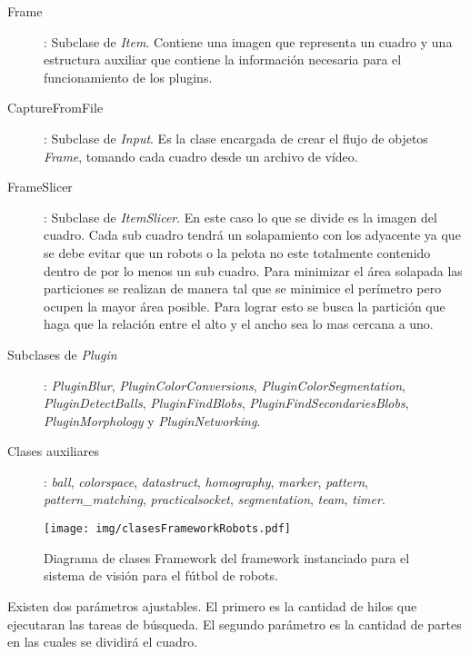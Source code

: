 \begin{description}

\item[Frame]: Subclase de \emph{Item}. Contiene una imagen que representa un
	cuadro y una estructura auxiliar que contiene la información necesaria
	para el funcionamiento de los plugins.

\item[CaptureFromFile]: Subclase de \emph{Input}. Es la clase encargada de crear
	el flujo de objetos \emph{Frame}, tomando cada cuadro desde un archivo
	de vídeo.

\item[FrameSlicer]: Subclase de \emph{ItemSlicer}. En este caso lo que se divide
	es la imagen del cuadro. Cada sub cuadro tendrá un solapamiento con los
	adyacente ya que se debe evitar que un robots o la pelota no este
	totalmente contenido dentro de por lo menos un sub cuadro. Para
	minimizar el área solapada las particiones se realizan de manera tal que
	se minimice el perímetro pero ocupen la mayor área posible. Para lograr
	esto se busca la partición que haga que la relación entre el alto y el
	ancho sea lo mas cercana a uno.

\item[Subclases de \emph{Plugin}]: \emph{PluginBlur},
	\emph{PluginColorConversions}, \emph{PluginColorSegmentation},
	\emph{PluginDetectBalls}, \emph{PluginFindBlobs},
	\emph{PluginFindSecondariesBlobs}, \emph{PluginMorphology} y
	\emph{PluginNetworking}.

\item[Clases auxiliares]: \emph{ball}, \emph{colorspace}, \emph{datastruct},
	\emph{homography}, \emph{marker}, \emph{pattern},
	\emph{pattern\_matching}, \emph{practicalsocket}, \emph{segmentation},
	\emph{team}, \emph{timer}.

\end{description}

\begin{figure}[h]

	\texttt{[image: img/clasesFrameworkRobots.pdf]}

	\caption{Diagrama de clases Framework del framework instanciado para el
	sistema de visión para el fútbol de robots.}

\end{figure}

Existen dos parámetros ajustables. El primero es la cantidad de hilos que
ejecutaran las tareas de búsqueda. El segundo parámetro es la cantidad de partes
en las cuales se dividirá el cuadro.
